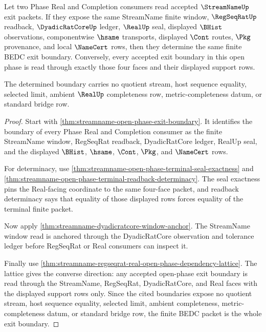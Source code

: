 \begin{theorem}
\label{thm:streamname-open-phase-finite-window-exit-determinacy}
Let two Phase Real and Completion consumers read accepted $\StreamNameUp$ exit packets. If they expose the same StreamName finite window, $\RegSeqRatUp$ readback, $\DyadicRatCoreUp$ ledger, $\RealUp$ seal, displayed $\BHist$ observations, componentwise $\hsame$ transports, displayed $\Cont$ routes, $\Pkg$ provenance, and local $\NameCert$ rows, then they determine the same finite BEDC exit boundary. Conversely, every accepted exit boundary in this open phase is read through exactly those four faces and their displayed support rows.

The determined boundary carries no quotient stream, host sequence equality, selected limit, ambient $\RealUp$ completeness row, metric-completeness datum, or standard bridge row.
\end{theorem}
\begin{proof}
Start with \autoref{thm:streamname-open-phase-exit-boundary}. It identifies the boundary of every Phase Real and Completion consumer as the finite StreamName window, RegSeqRat readback, DyadicRatCore ledger, RealUp seal, and the displayed $\BHist$, $\hsame$, $\Cont$, $\Pkg$, and $\NameCert$ rows.

For determinacy, use \autoref{thm:streamname-open-phase-terminal-seal-exactness} and \autoref{thm:streamname-open-phase-terminal-readback-determinacy}. The seal exactness pins the Real-facing coordinate to the same four-face packet, and readback determinacy says that equality of those displayed rows forces equality of the terminal finite packet.

Now apply \autoref{thm:streamname-dyadicratcore-window-anchor}. The StreamName window read is anchored through the DyadicRatCore observation and tolerance ledger before RegSeqRat or Real consumers can inspect it.

Finally use \autoref{thm:streamname-regseqrat-real-open-phase-dependency-lattice}. The lattice gives the converse direction: any accepted open-phase exit boundary is read through the StreamName, RegSeqRat, DyadicRatCore, and Real faces with the displayed support rows only. Since the cited boundaries expose no quotient stream, host sequence equality, selected limit, ambient completeness, metric-completeness datum, or standard bridge row, the finite BEDC packet is the whole exit boundary.
\end{proof}

